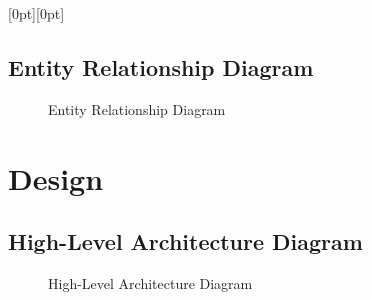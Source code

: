 \documentclass[a4paper]{article}
\newcommand{\Lpagenumber}{\ifdim\textwidth=\linewidth\else\bgroup
  \thispagestyle{empty}
  \dimendef\margin=0
  \ifodd\value{page}\margin=\oddsidemargin
  \else\margin=\evensidemargin
  \fi
  \raisebox{\dimexpr -\topmargin-\headheight-\headsep-0.5\linewidth}[0pt][0pt]{%
    \rlap{\hspace{\dimexpr \margin+\textheight+\footskip}%
    \llap{\rotatebox{0}{\thepage}}}}%
\egroup\fi}
\begin{document}
\begin{landscape}
\Lpagenumber
\subsection{Entity Relationship Diagram}
\begin{figure}[!ht] %
    \centering{} %
    \caption{Entity Relationship Diagram}
    \label{fig:erd}
\end{figure}
\end{landscape}

\section{Design}
\subsection{High-Level Architecture Diagram}
\begin{figure}[!ht] %
    \centering{} %
    \caption{High-Level Architecture Diagram}
    \label{fig:arch}
\end{figure}
\end{document}
